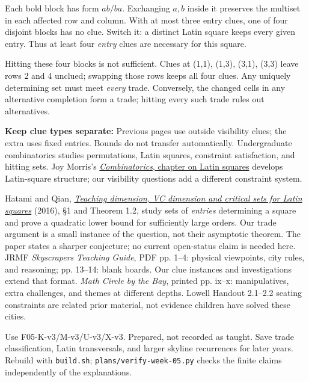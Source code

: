 \documentclass[11pt]{article}
\begin{document}
\newpage
{}
Each bold block has form \(ab/ba\). Exchanging \(a,b\) inside it preserves the multiset in each affected row and column. With at most three entry clues, one of four disjoint blocks has no clue. Switch it: a distinct Latin square keeps every given entry. Thus at least four \emph{entry} clues are necessary for this square.

Hitting these four blocks is not sufficient. Clues at (1,1), (1,3), (3,1), (3,3) leave rows 2 and 4 unclued; swapping those rows keeps all four clues. Any uniquely determining set must meet \emph{every} trade. Conversely, the changed cells in any alternative completion form a trade; hitting every such trade rules out alternatives.

\textbf{Keep clue types separate:} Previous pages use outside visibility clues; the extra uses fixed entries. Bounds do not transfer automatically.
Undergraduate combinatorics studies permutations, Latin squares, constraint satisfaction, and hitting sets. Joy Morris's \href{https://opentext.uleth.ca/Combinatorics/ch_Latin-squares.html}{\emph{Combinatorics}, chapter on Latin squares} develops Latin-square structure; our visibility questions add a different constraint system.

Hatami and Qian, \href{https://arxiv.org/html/1606.00032}{\emph{Teaching dimension, VC dimension and critical sets for Latin squares}} (2016), \S1 and Theorem 1.2, study sets of \emph{entries} determining a square and prove a quadratic lower bound for sufficiently large orders. Our trade argument is a small instance of the question, not their asymptotic theorem. The paper states a sharper conjecture; no current open-status claim is needed here.
JRMF \emph{Skyscrapers Teaching Guide}, PDF pp. 1--4: physical viewpoints, city rules, and reasoning; pp. 13--14: blank boards. Our clue instances and investigations extend that format. \emph{Math Circle by the Bay}, printed pp. ix--x: manipulatives, extra challenges, and themes at different depths. Lowell Handout 2.1--2.2 seating constraints are related prior material, not evidence children have solved these cities.

Use F05-K-v3/M-v3/U-v3/X-v3. Prepared, not recorded as taught. Save trade classification, Latin transversals, and larger skyline recurrences for later years. Rebuild with \texttt{build.sh}; \texttt{plans/verify-week-05.py} checks the finite claims independently of the explanations.
\end{document}
